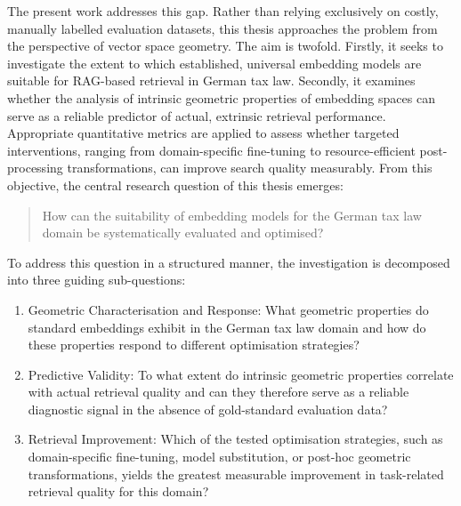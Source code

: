 The present work addresses this gap. Rather than relying exclusively on costly, manually labelled evaluation datasets, this thesis approaches the problem from the perspective of vector space geometry. The aim is twofold. Firstly, it seeks to investigate the extent to which established, universal embedding models are suitable for \ac{RAG}-based retrieval in German tax law. Secondly, it examines whether the analysis of intrinsic geometric properties of embedding spaces can serve as a reliable predictor of actual, extrinsic retrieval performance. Appropriate quantitative metrics are applied to assess whether targeted interventions, ranging from domain-specific fine-tuning to resource-efficient post-processing transformations, can improve search quality measurably. From this objective, the central research question of this thesis emerges:

\begin{quote}
    How can the suitability of embedding models for the German tax law domain be systematically evaluated and optimised?
\end{quote}

To address this question in a structured manner, the investigation is decomposed into three guiding sub-questions:

\begin{enumerate}
    \item Geometric Characterisation and Response: What geometric properties do standard embeddings exhibit in the German tax law domain and how do these properties respond to different optimisation strategies?
    \item Predictive Validity: To what extent do intrinsic geometric properties correlate with actual retrieval quality and can they therefore serve as a reliable diagnostic signal in the absence of gold-standard evaluation data?
    \item Retrieval Improvement: Which of the tested optimisation strategies, such as domain-specific fine-tuning, model substitution, or post-hoc geometric transformations, yields the greatest measurable improvement in task-related retrieval quality for this domain?
\end{enumerate}

